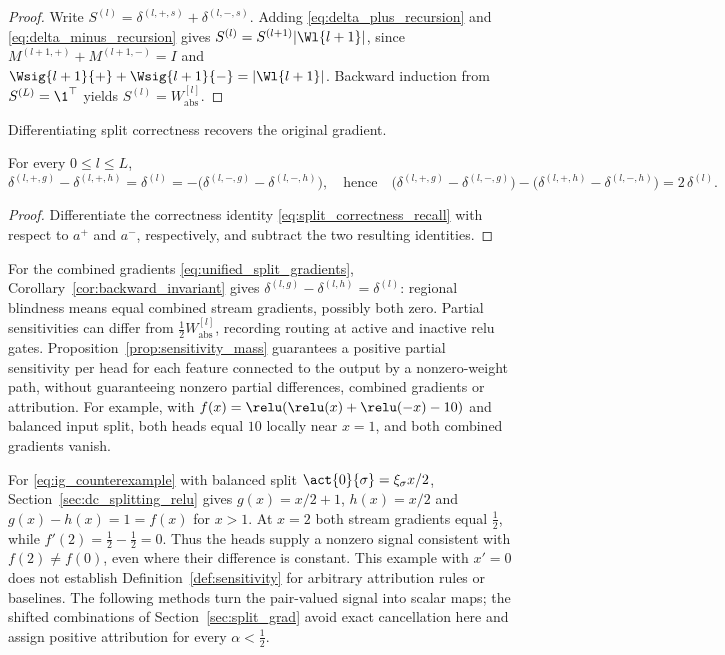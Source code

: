 \begin{proof}
Write $S^{(l)}=\delta^{(l,+,s)}+\delta^{(l,-,s)}$. Adding \eqref{eq:delta_plus_recursion} and \eqref{eq:delta_minus_recursion} gives $S^{(l)}=S^{(l+1)}|\Wl{l+1}|$, since $M^{(l+1,+)}+M^{(l+1,-)}=I$ and $\Wsig{l+1}{+}+\Wsig{l+1}{-}=|\Wl{l+1}|$. Backward induction from $S^{(L)}=\1^\top$ yields $S^{(l)}=W_{\mathrm{abs}}^{[l]}$.
\end{proof}

Differentiating split correctness recovers the original gradient.

\begin{corollary}\label{cor:backward_invariant}
For every $0 \leq l \leq L$,
\begin{equation}
	\delta^{(l, +, g)} - \delta^{(l, +, h)} = \delta^{(l)} = -\bigl( \delta^{(l, -, g)} - \delta^{(l, -, h)} \bigr),
	\quad \text{hence} \quad
	\bigl( \delta^{(l,+,g)} - \delta^{(l,-,g)} \bigr) - \bigl( \delta^{(l,+,h)} - \delta^{(l,-,h)} \bigr) = 2\,\delta^{(l)}.
	\label{eq:backward_invariant}
\end{equation}\end{corollary}

\begin{proof}
Differentiate the correctness identity \eqref{eq:split_correctness_recall} with respect to $a^{+}$ and $a^{-}$, respectively, and subtract the two resulting identities.
\end{proof}

For the combined gradients \eqref{eq:unified_split_gradients}, Corollary~\ref{cor:backward_invariant} gives $\delta^{(l,g)}-\delta^{(l,h)}=\delta^{(l)}$: regional blindness means equal combined stream gradients, possibly both zero. Partial sensitivities can differ from $\tfrac12W_{\mathrm{abs}}^{[l]}$, recording routing at active and inactive \ac{relu} gates. Proposition~\ref{prop:sensitivity_mass} guarantees a positive partial sensitivity per head for each feature connected to the output by a nonzero-weight path, without guaranteeing nonzero partial differences, combined gradients or attribution. For example, with $f(x)=\relu(\relu(x)+\relu(-x)-10)$ and balanced input split, both heads equal $10$ locally near $x=1$, and both combined gradients vanish.

\begin{remark}\label{rem:counterexample_split}
For \eqref{eq:ig_counterexample} with balanced split $\act{0}{\sigma}=\xi_\sigma x/2$, Section~\ref{sec:dc_splitting_relu} gives $g(x)=x/2+1$, $h(x)=x/2$ and $g(x)-h(x)=1=f(x)$ for $x>1$. At $x=2$ both stream gradients equal $\tfrac{1}{2}$, while $f'(2)=\tfrac{1}{2}-\tfrac{1}{2}=0$. Thus the heads supply a nonzero signal consistent with $f(2)\neq f(0)$, even where their difference is constant. This example with $x'=0$ does not establish Definition~\ref{def:sensitivity} for arbitrary attribution rules or baselines. The following methods turn the pair-valued signal into scalar maps; the shifted combinations of Section~\ref{sec:split_grad} avoid exact cancellation here and assign positive attribution for every $\alpha<\tfrac{1}{2}$.
\end{remark}

